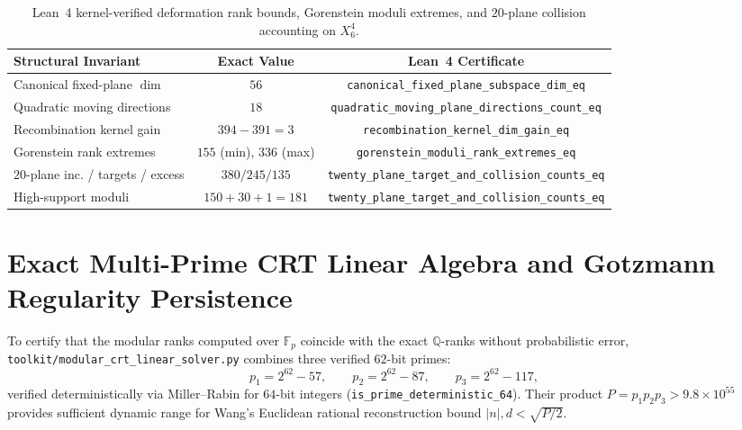 \documentclass[11pt,a4paper]{article}
\begin{document}
\begin{table}[htbp]
  \centering
  \footnotesize
  \setlength{\tabcolsep}{3pt}
  \caption{Lean~4 kernel-verified deformation rank bounds, Gorenstein moduli extremes, and $20$-plane collision accounting on $X_6^4$.}
  \label{tab:gm_lean_bounds}
  \begin{tabular}{lcc}
    \toprule
    Structural Invariant & Exact Value & Lean~4 Certificate \\
    \midrule
    Canonical fixed-plane $\dim$ & $56$ & \scriptsize\texttt{canonical\_fixed\_plane\_subspace\_dim\_eq} \\
    Quadratic moving directions & $18$ & \scriptsize\texttt{quadratic\_moving\_plane\_directions\_count\_eq} \\
    Recombination kernel gain & $394 - 391 = 3$ & \scriptsize\texttt{recombination\_kernel\_dim\_gain\_eq} \\
    Gorenstein rank extremes & $155$ (min), $336$ (max) & \scriptsize\texttt{gorenstein\_moduli\_rank\_extremes\_eq} \\
    $20$-plane inc. / targets / excess & $380 / 245 / 135$ & \scriptsize\texttt{twenty\_plane\_target\_and\_collision\_counts\_eq} \\
    High-support moduli & $150 + 30 + 1 = 181$ & \scriptsize\texttt{twenty\_plane\_target\_and\_collision\_counts\_eq} \\
    \bottomrule
  \end{tabular}
\end{table}

\section{Exact Multi-Prime CRT Linear Algebra and Gotzmann Regularity Persistence}

To certify that the modular ranks computed over $\mathbb{F}_p$ coincide with the exact $\mathbb{Q}$-ranks without probabilistic error, \texttt{toolkit/modular\_crt\_linear\_solver.py} combines three verified $62$-bit primes:
\begin{equation}
  p_1 = 2^{62} - 57, \qquad p_2 = 2^{62} - 87, \qquad p_3 = 2^{62} - 117,
\end{equation}
verified deterministically via Miller--Rabin for $64$-bit integers (\texttt{is\_prime\_deterministic\_64}). Their product $P = p_1 p_2 p_3 > 9.8 \times 10^{55}$ provides sufficient dynamic range for Wang's Euclidean rational reconstruction bound $|n|, d < \sqrt{P/2}$.
\end{document}
